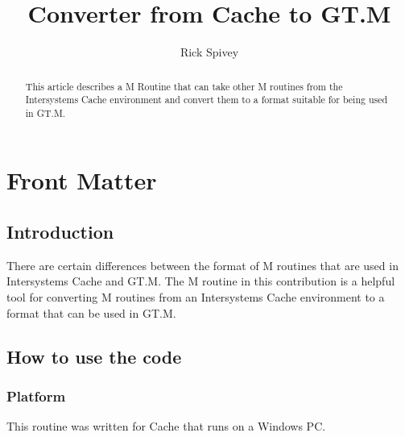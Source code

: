 \documentclass{OSEHRAArticle}
\title{Converter from Cache to GT.M}
\author{Rick Spivey}
\newcommand{\OTJhandlerIDnumber}{17}
\begin{document}
%
%
\OTJhandlefooter{\OTJhandlerIDnumber}


\ifpdf
\else
\fi


\maketitle


\ifhtml
\chapter*{Front Matter\label{front}}
\fi


\begin{abstract}
\noindent
This article describes a M Routine that can take other M routines from the
Intersystems Cache environment and convert them to a format suitable for being
used in GT.M.
\end{abstract}

\tableofcontents

\section{Introduction}
There are certain differences between the format of M routines that are used in
Intersystems Cache and GT.M. The M routine in this contribution is a helpful
tool for converting M routines from an Intersystems Cache environment to a
format that can be used in GT.M.

\section{How to use the code}

\subsection{Platform}

This routine was written for Cache that runs on a Windows PC.
\end{document}

